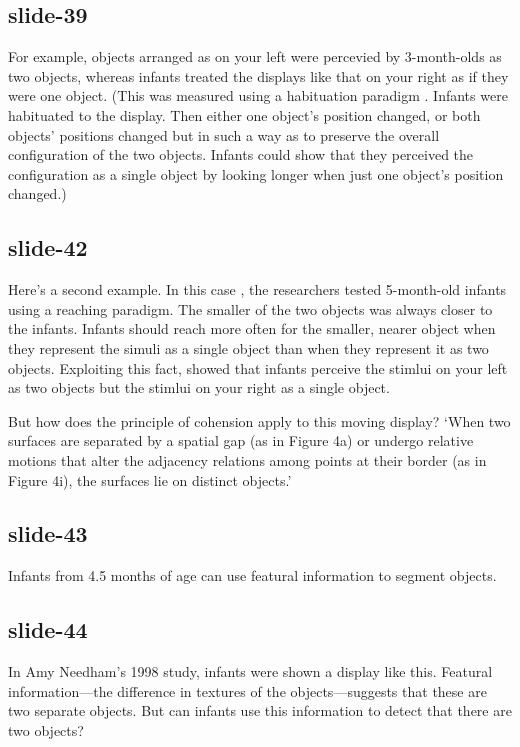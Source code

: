 \documentclass[12pt,\papersize]{extarticle}
\begin{document}
 
\subsection{slide-39}
For example, objects arranged as on your left were percevied by 3-month-olds as two objects, whereas infants treated the displays like that on your right as if they were one object.
(This was measured using a habituation paradigm \citep{kestenbaum:1987_perception}. Infants were habituated to the display. Then either one object's position changed, or both objects' positions changed but in such a way as to preserve the overall configuration of the two objects. Infants could show that they perceived the configuration as a single object by looking longer when just one object's position changed.)
 
 
\subsection{slide-42}
Here's a second example.
In this case \citep[Experiment 2]{spelke:1989_reaching}, the researchers tested 5-month-old infants using a reaching paradigm.
The smaller of the two objects was always closer to the infants. Infants should reach more often for the smaller, nearer object when they represent the simuli as a single object than when they represent it as two objects.
Exploiting this fact, \citet[Experiment 2]{spelke:1989_reaching} showed that infants perceive the stimlui on your left as two objects but the stimlui on your right as a single object.
 
But how does the principle of cohension apply to this moving display? ‘When two surfaces are separated by a spatial gap (as in Figure 4a) or undergo relative motions that alter the adjacency relations among points at their border (as in Figure 4i), the surfaces lie on distinct objects.’
 
 
\subsection{slide-43}
Infants from 4.5 months of age can use featural information to segment objects.
 
 
\subsection{slide-44}
In Amy Needham's 1998 study, infants were shown a display like this.
Featural information---the difference in textures of the objects---suggests that these are two separate objects.
But can infants use this information to detect that there are two objects?
 
\end{document}
